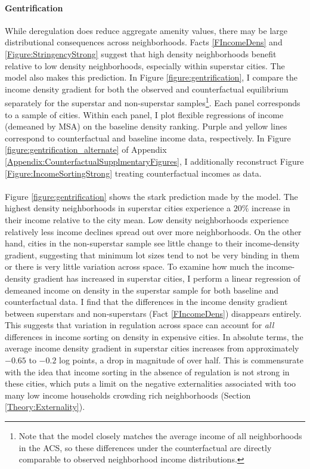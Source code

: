 \documentclass[12pt]{article}
\begin{document}
\paragraph*{Gentrification} While deregulation does reduce aggregate amenity values, there may be large distributional consequences across neighborhoods. Facts \ref{FIncomeDens} and \ref{Figure:StringencyStrong} suggest that high density neighborhoods benefit relative to low density neighborhoods, especially within superstar cities. The model also makes this prediction. In Figure \ref{figure:gentrification}, I compare the income density gradient for both the observed and counterfactual equilibrium separately for the superstar and non-superstar samples\footnote{Note that the model closely matches the average income of all neighborhoods in the ACS, so these differences under the counterfactual are directly comparable to observed neighborhood income distributions.}. Each panel corresponds to a sample of cities. Within each panel, I plot flexible regressions of income (demeaned by MSA) on the baseline density ranking. Purple and yellow lines correspond to counterfactual and baseline income data, respectively. In Figure \ref{figure:gentrification_alternate} of Appendix \ref{Appendix:CounterfactualSupplmentaryFigures}, I additionally reconstruct Figure \ref{Figure:IncomeSortingStrong} treating counterfactual incomes as data.

\paragraph*{}
Figure \ref{figure:gentrification} shows the stark prediction made by the model. The highest density neighborhoods in superstar cities experience a $20\%$ increase in their income relative to the city mean. Low density neighborhoods experience relatively less income declines spread out over more neighborhoods. On the other hand, cities in the non-superstar sample see little change to their income-density gradient, suggesting that minimum lot sizes tend to not be very binding in them or there is very little variation across space. To examine how much the income-density gradient has increased in superstar cities, I perform a linear regression of demeaned income on density in the superstar sample for both baseline and counterfactual data. I find that the differences in the income density gradient between superstars and non-superstars (Fact \ref{FIncomeDens}) disappears entirely. This suggests that variation in regulation across space can account for \textit{all} differences in income sorting on density in expensive cities. In absolute terms, the average income density gradient in superstar cities increases from approximately $-0.65$ to $-0.2$ log points, a drop in magnitude of over half. This is commensurate with the idea that income sorting in the absence of regulation is not strong in these cities, which puts a limit on the negative externalities associated with too many low income households crowding rich neighborhoods (Section \ref{Theory:Externality}). 
\end{document}
